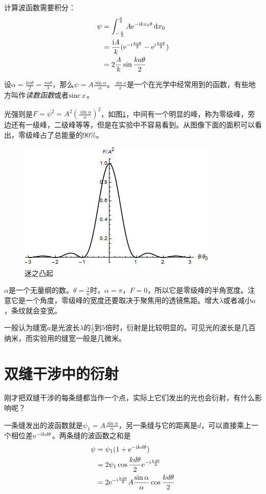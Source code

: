 计算波函数需要积分：
\begin{align*}
\psi&=\int_{-\frac{a}{2}}^{\frac{a}{2}} A \mathrm{e}^{-\mathrm{i} k x_0 \theta} \mathop{}\!\mathrm{d} x_0 \\
&=\frac{\mathrm{i} A}{k} (\mathrm{e}^{-\mathrm{i} \frac{k a \theta}{2}}-\mathrm{e}^{\mathrm{i} \frac{k a \theta}{2}}) \\
&=2 \frac{A}{k} \sin \frac{k a \theta}{2}
\end{align*}

设$\alpha=\frac{k a \theta}{2}=\frac{\pi a \theta}{\lambda}$，那么$\psi=A \frac{\sin \alpha}{\alpha}$。$\frac{\sin x}{x}$是一个在光学中经常用到的函数，有些地方叫作\emph{读数函数}或者$\mathrm{sinc}\mathop{}\! x$。

光强则是$F=\psi^2=A^2 (\frac{\sin \alpha}{\alpha})^2$，如图\ref{fig-silt-diff-plot}，中间有一个明显的峰，称为零级峰，旁边还有一级峰，二级峰等等，但是在实验中不容易看到。从图像下面的面积可以看出，零级峰占了总能量的90\%。
\begin{figure}[htb]
\centering
\includegraphics[scale=0.5]{fig/silt-diff-plot}
\caption{迷之凸起}
\label{fig-silt-diff-plot}
\end{figure}

$\alpha$是一个无量纲的数。$\theta=\frac{\lambda}{a}$时，$\alpha=\pi$，$F=0$，所以它是零级峰的半角宽度。注意它是一个角度，零级峰的宽度还要取决于聚焦用的透镜焦距。增大$\lambda$或者减小$a$，条纹就会变宽。

一般认为缝宽$a$是光波长$\lambda$的$\frac{1}{5}$到$5$倍时，衍射是比较明显的。可见光的波长是几百纳米，而实验用的缝宽一般是几微米。
\section{双缝干涉中的衍射}
刚才把双缝干涉的每条缝都当作一个点，实际上它们发出的光也会衍射，有什么影响呢？

一条缝发出的波函数就是$\psi_1=A \frac{\sin \alpha}{\alpha}$，另一条缝与它的距离是$d$，可以直接乘上一个相位差$\mathrm{e}^{-\mathrm{i} k d \theta}$。两条缝的波函数之和是
\begin{align*}
\psi&=\psi_1 (1+\mathrm{e}^{-\mathrm{i} k d \theta}) \\
&=2 \psi_1 \cos \frac{k d \theta}{2} \mathrm{e}^{-\mathrm{i} \frac{k d \theta}{2}} \\
&=2 \mathrm{e}^{-\mathrm{i} \frac{k d \theta}{2}} A \frac{\sin \alpha}{\alpha} \cos \frac{k d \theta}{2}
\end{align*}

